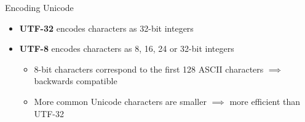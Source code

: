 \begin{frame}{Encoding Unicode}
    \begin{itemize}
		\pause\item \textbf{UTF-32} encodes characters as 32-bit integers
		\pause\item \textbf{UTF-8} encodes characters as 8, 16, 24 or 32-bit integers
			\begin{itemize}
			    \pause\item 8-bit characters correspond to the first 128 ASCII characters
			        $\implies$ backwards compatible
				\pause\item More common Unicode characters are smaller
				    $\implies$ more efficient than UTF-32
			\end{itemize}
	\end{itemize}
\end{frame}

	


